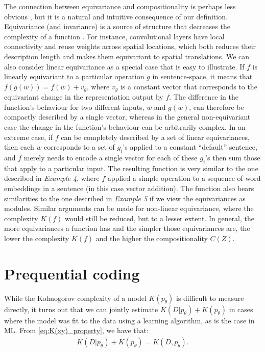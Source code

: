 \documentclass{article}
\begin{document}
\begin{appendices}
The connection between equivariance and compositionality is perhaps less obvious \citep{gordon2020permutation}, but it is a natural and intuitive consequence of our definition. Equivariance (and invariance) is a source of structure that decreases the complexity of a function \citep{immer2022invariance,wilk2018learning,van2022learning}. For instance, convolutional layers have local connectivity and reuse weights across spatial locations, which both reduces their description length and makes them equivariant to spatial translations. We can also consider linear equivariance as a special case that is easy to illustrate. If $f$ is linearly equivariant to a particular operation $g$ in sentence-space, it means that $f(g(w)) = f(w) + v_g$, where $v_g$ is a constant vector that corresponds to the equivariant change in the representation output by $f$. The difference in the function's behaviour for two different inputs, $w$ and $g(w)$, can therefore be compactly described by a single vector, whereas in the general non-equivariant case the change in the function's behaviour can be arbitrarily complex. In an extreme case, if $f$ can be completely described by a set of linear equivariances, then each $w$ corresponds to a set of $g_i$'s applied to a constant ``default'' sentence, and $f$ merely needs to encode a single vector for each of these $g_i$'s then sum those that apply to a particular input. The resulting function is very similar to the one described in \textit{Example 4}, where $f$ applied a simple operation to a sequence of word embeddings in a sentence (in this case vector addition). The function also bears similarities to the one described in \textit{Example 5} if we view the equivariances as modules. Similar arguments can be made for non-linear equivariance, where the complexity $K(f)$ would still be reduced, but to a lesser extent. In general, the more equivariances a function has and the simpler those equivariances are, the lower the complexity $K(f)$ and the higher the compositionality $C(Z)$.


\section{Prequential coding}
\label{sec:prequential}

While the Kolmogorov complexity of a model $K(p_\theta)$ is difficult to measure directly, it turns out that we can jointly estimate $K(D|p_\theta) + K(p_\theta)$ in cases where the model was fit to the data using a learning algorithm, as is the case in ML. From \cref{eq:K(xy)_property}, we have that:
\begin{align}
    K(D|p_\theta) + K(p_\theta) = K(D, p_\theta) .
\end{align}


\end{appendices}
\end{document}
